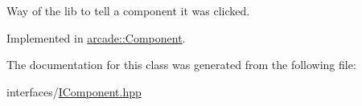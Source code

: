Way of the lib to tell a component it was clicked. 



Implemented in \hyperlink{classarcade_1_1_component_add191bdc12082bbc7a4d575e6400bf73}{arcade\-::\-Component}.



The documentation for this class was generated from the following file\-:\begin{DoxyCompactItemize}
\item 
interfaces/\hyperlink{_i_component_8hpp}{I\-Component.\-hpp}\end{DoxyCompactItemize}
